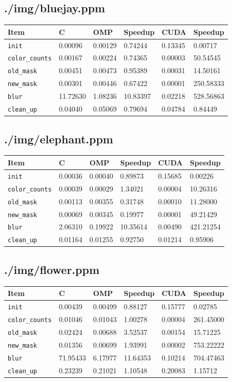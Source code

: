 \documentclass[12pt]{article}
\begin{document}
\subsection{./img/bluejay.ppm}
\begin{tabular}{l|l|l|l|l|l}
    Item & C & OMP & Speedup & CUDA & Speedup
\\  \hline
    \texttt{init} & 0.00096 & 0.00129 & 0.74244 & 0.13345 & 0.00717
\\  \texttt{color_counts} & 0.00167 & 0.00224 & 0.74365 & 0.00003 & 50.54545
\\  \texttt{old_mask} & 0.00451 & 0.00473 & 0.95389 & 0.00031 & 14.50161
\\  \texttt{new_mask} & 0.00301 & 0.00446 & 0.67422 & 0.00001 & 250.58333
\\  \texttt{blur} & 11.72630 & 1.08236 & 10.83397 & 0.02218 & 528.56863
\\  \texttt{clean_up} & 0.04040 & 0.05069 & 0.79694 & 0.04784 & 0.84449
\end{tabular}
\subsection{./img/elephant.ppm}
\begin{tabular}{l|l|l|l|l|l}
    Item & C & OMP & Speedup & CUDA & Speedup
\\  \hline
    \texttt{init} & 0.00036 & 0.00040 & 0.89873 & 0.15685 & 0.00226
\\  \texttt{color_counts} & 0.00039 & 0.00029 & 1.34021 & 0.00004 & 10.26316
\\  \texttt{old_mask} & 0.00113 & 0.00355 & 0.31748 & 0.00010 & 11.28000
\\  \texttt{new_mask} & 0.00069 & 0.00345 & 0.19977 & 0.00001 & 49.21429
\\  \texttt{blur} & 2.06310 & 0.19922 & 10.35614 & 0.00490 & 421.21254
\\  \texttt{clean_up} & 0.01164 & 0.01255 & 0.92750 & 0.01214 & 0.95906
\end{tabular}
\subsection{./img/flower.ppm}
\begin{tabular}{l|l|l|l|l|l}
    Item & C & OMP & Speedup & CUDA & Speedup
\\  \hline
    \texttt{init} & 0.00439 & 0.00499 & 0.88127 & 0.15777 & 0.02785
\\  \texttt{color_counts} & 0.01046 & 0.01043 & 1.00278 & 0.00004 & 261.45000
\\  \texttt{old_mask} & 0.02424 & 0.00688 & 3.52537 & 0.00154 & 15.71225
\\  \texttt{new_mask} & 0.01356 & 0.00699 & 1.93991 & 0.00002 & 753.22222
\\  \texttt{blur} & 71.95433 & 6.17977 & 11.64353 & 0.10214 & 704.47463
\\  \texttt{clean_up} & 0.23239 & 0.21021 & 1.10548 & 0.20083 & 1.15712
\end{tabular}
\end{document}
